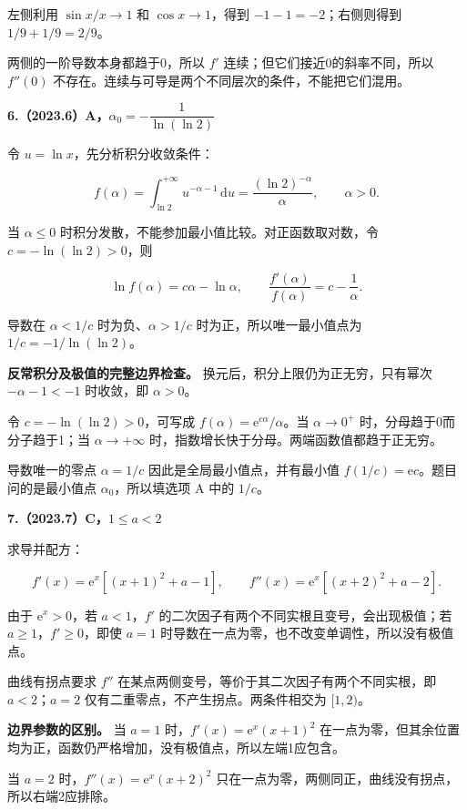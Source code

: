 \documentclass[UTF8,11pt,fontset=windows]{ctexart}
\begin{document}
左侧利用 $\sin x/x\to1$ 和 $\cos x\to1$，得到 $-1-1=-2$；右侧则得到 $1/9+1/9=2/9$。

两侧的一阶导数本身都趋于0，所以 $f'$ 连续；但它们接近0的斜率不同，所以 $f''(0)$ 不存在。连续与可导是两个不同层次的条件，不能把它们混用。

\clearpage

\textbf{6.（2023.6）A，$\alpha_0=-\dfrac1{\ln(\ln2)}$}

令 $u=\ln x$，先分析积分收敛条件：

$$
f(\alpha)=\int_{\ln2}^{+\infty}u^{-\alpha-1}\,\mathrm du
=\frac{(\ln2)^{-\alpha}}{\alpha},\qquad \alpha>0.
$$

当 $\alpha\le0$ 时积分发散，不能参加最小值比较。对正函数取对数，令 $c=-\ln(\ln2)>0$，则

$$
\ln f(\alpha)=c\alpha-\ln\alpha,\qquad
\frac{f'(\alpha)}{f(\alpha)}=c-\frac1\alpha.
$$

导数在 $\alpha<1/c$ 时为负、$\alpha>1/c$ 时为正，所以唯一最小值点为 $1/c=-1/\ln(\ln2)$。

\textbf{反常积分及极值的完整边界检查。} 换元后，积分上限仍为正无穷，只有幂次 $-\alpha-1<-1$ 时收敛，即 $\alpha>0$。

令 $c=-\ln(\ln2)>0$，可写成 $f(\alpha)=\mathrm e^{c\alpha}/\alpha$。当 $\alpha\to0^+$ 时，分母趋于0而分子趋于1；当 $\alpha\to+\infty$ 时，指数增长快于分母。两端函数值都趋于正无穷。

导数唯一的零点 $\alpha=1/c$ 因此是全局最小值点，并有最小值 $f(1/c)=\mathrm e c$。题目问的是最小值点 $\alpha_0$，所以填选项 A 中的 $1/c$。

\clearpage

\textbf{7.（2023.7）C，$1\le a<2$}

求导并配方：

$$
f'(x)=\mathrm e^x[(x+1)^2+a-1],\qquad
f''(x)=\mathrm e^x[(x+2)^2+a-2].
$$

由于 $\mathrm e^x>0$，若 $a<1$，$f'$ 的二次因子有两个不同实根且变号，会出现极值；若 $a\ge1$，$f'\ge0$，即使 $a=1$ 时导数在一点为零，也不改变单调性，所以没有极值点。

曲线有拐点要求 $f''$ 在某点两侧变号，等价于其二次因子有两个不同实根，即 $a<2$；$a=2$ 仅有二重零点，不产生拐点。两条件相交为 $[1,2)$。

\textbf{边界参数的区别。} 当 $a=1$ 时，$f'(x)=\mathrm e^x(x+1)^2$ 在一点为零，但其余位置均为正，函数仍严格增加，没有极值点，所以左端1应包含。

当 $a=2$ 时，$f''(x)=\mathrm e^x(x+2)^2$ 只在一点为零，两侧同正，曲线没有拐点，所以右端2应排除。
\end{document}
